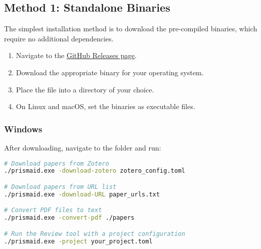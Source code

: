 \subsection{Method 1: Standalone Binaries}

The simplest installation method is to download the pre-compiled binaries, which require no additional dependencies.

\begin{enumerate}
    \item Navigate to the \href{https://github.com/open-and-sustainable/prismaid/releases}{GitHub Releases page}.
    \item Download the appropriate binary for your operating system.
    \item Place the file into a directory of your choice.
    \item On Linux and macOS, set the binaries as executable files.
\end{enumerate}

\subsubsection{Windows}
\begin{commandbox}
After downloading, navigate to the folder and run:
\begin{lstlisting}[language=Bash]
# Download papers from Zotero
./prismaid.exe -download-zotero zotero_config.toml

# Download papers from URL list
./prismaid.exe -download-URL paper_urls.txt

# Convert PDF files to text
./prismaid.exe -convert-pdf ./papers

# Run the Review tool with a project configuration
./prismaid.exe -project your_project.toml
\end{lstlisting}
\end{commandbox}


